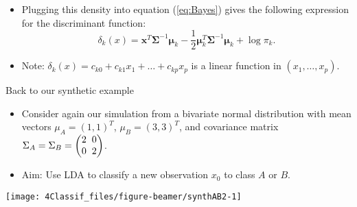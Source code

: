 \documentclass[10pt,ignorenonframetext,]{beamer}
\begin{document}
\begin{frame}

\begin{itemize}
\item
  Plugging this density into equation (\ref{eq:Bayes}) gives the
  following expression for the discriminant function:
  \[\delta_k(x) = {\boldsymbol x}^T \boldsymbol{\Sigma}^{-1}\boldsymbol\mu_k - \frac{1}{2}\boldsymbol\mu_k^T \boldsymbol{\Sigma}^{-1}\boldsymbol\mu_k + \log \pi_k.\]
\item
  Note: \(\delta_k(x) = c_{k0} + c_{k1}x_1 + \ldots + c_{kp}x_p\) is a
  linear function in \((x_1,\ldots ,x_p)\).
\end{itemize}

\end{frame}

\begin{frame}

\begin{block}{Back to our synthetic example}

\vspace{2mm}

\begin{itemize}
\item
  Consider again our simulation from a bivariate normal distribution
  with mean vectors \(\mu_A = (1, 1)^T\), \(\mu_B = (3, 3)^T\), and
  covariance matrix
  \(\Sigma_A = \Sigma_B = \begin{pmatrix} 2\hspace{2mm} 0 \\ 0 \hspace{2mm} 2 \end{pmatrix}\).
\item
  Aim: Use LDA to classify a new observation \(x_0\) to class \(A\) or
  \(B\).
\end{itemize}

\vspace{4mm}

\begin{center}\texttt{[image: 4Classif\_files/figure-beamer/synthAB2-1]} \end{center}

\end{block}

\end{frame}
\end{document}
